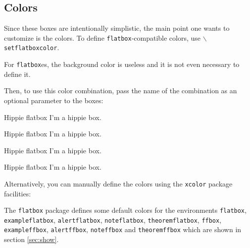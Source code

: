 \documentclass[a4paper]{article}
\begin{document}
\subsection{Colors}
Since these boxes are intentionally simplistic, the main point one wants to
customize is the colors. To define \texttt{flatbox}-compatible colors, use \texttt{$\backslash$setflatboxcolor}.

\begin{latexcode}
\end{latexcode}

For \texttt{flatbox}es, the background color is useless and it is not even
necessary to define it.

Then, to use this color combination, pass the name of the combination as an
optional parameter to the boxes:

\begin{latexcode}
\begin{flatbox}[hippie]{Hippie flatbox}
  I'm a hippie box.
\end{flatbox}

\begin{ffbox}[hippie]{Hippie flatbox}
  I'm a hippie box.
\end{ffbox}
\end{latexcode}


\begin{flatbox}[hippie]{Hippie flatbox}
  I'm a hippie box.
\end{flatbox}

\begin{ffbox}[hippie]{Hippie flatbox}
  I'm a hippie box.
\end{ffbox}

\medskip

Alternatively, you can manually define the colors using the \texttt{xcolor}
package facilities:

\begin{latexcode}
\end{latexcode}

\bigskip

The \texttt{flatbox} package defines some default colors for the environments
\texttt{flatbox}, \texttt{exampleflatbox}, \texttt{alertflatbox},
\texttt{noteflatbox}, \texttt{theoremflatbox},
\texttt{ffbox}, \texttt{exampleffbox}, \texttt{alertffbox},
\texttt{noteffbox} and \texttt{theoremffbox} which are shown in section \ref{sec:show}.
\end{document}
